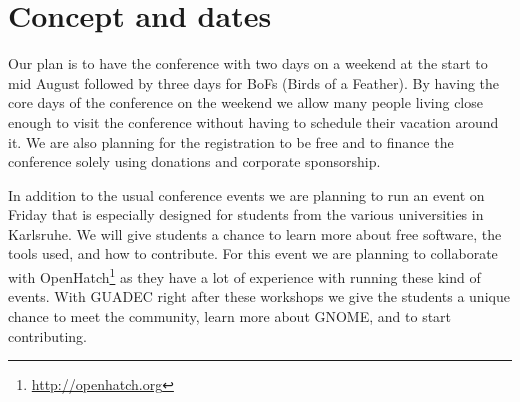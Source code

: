 
\newpage




\begin{tikzpicture}
\end{tikzpicture}

\vspace*{8.5cm}

\section{Concept and dates}

Our plan is to have the conference with two days on a weekend at the start to mid
August followed by three days for BoFs (Birds of a Feather). By having the core
days of the conference on the weekend we allow many people living close enough to visit
the conference without having to schedule their vacation around it. We are also
planning for the registration to be free and to finance the conference solely
using donations and corporate sponsorship.

In addition to the usual conference events we are planning to run an event
on Friday that is especially designed for students from the various universities
in Karlsruhe. We will give students a chance to learn more about free software,
the tools used, and how to contribute. For this event we are planning to collaborate with
OpenHatch\footnote{\url{http://openhatch.org}} as they have a lot of experience
with running these kind of events. With GUADEC right after these workshops
we give the students a unique chance to meet the community, learn more about GNOME,
and to start contributing.

